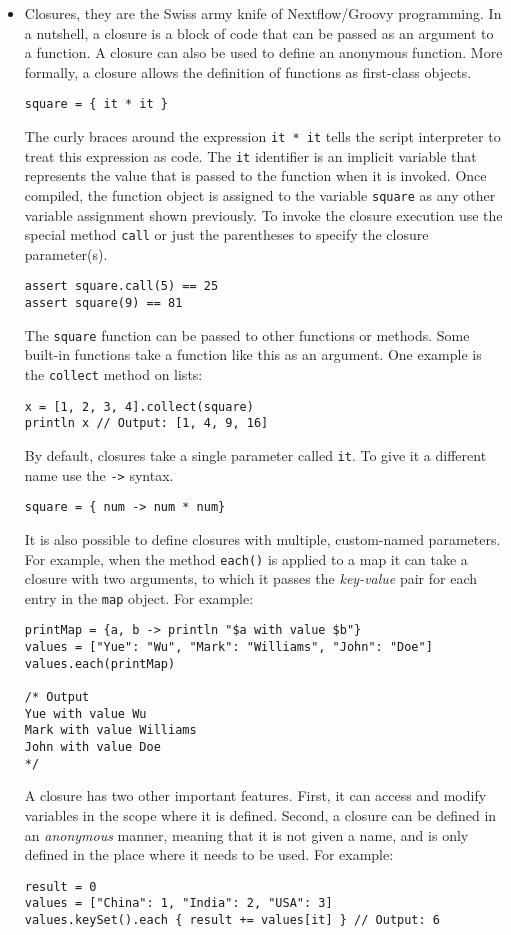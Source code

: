 \documentclass[letterpaper,11pt]{article}
\begin{document}
\begin{itemize}
\item Closures, they are the Swiss army knife of Nextflow/Groovy programming. In a nutshell, a closure is a block of code that can be passed as an argument to a function. A closure can also be used to define an anonymous function. More formally, a closure allows the definition of functions as first-class objects.
\begin{verbatim}
square = { it * it }
\end{verbatim}
The curly braces around the expression \texttt{it * it} tells the script interpreter to treat this expression as code. The \texttt{it} identifier is an implicit variable that represents the value that is passed to the function when it is invoked. Once compiled, the function object is assigned to the variable \texttt{square} as any other variable assignment shown previously. To invoke the closure execution use the special method \texttt{call} or just the parentheses to specify the closure parameter(s).
\begin{verbatim}
assert square.call(5) == 25
assert square(9) == 81
\end{verbatim}
The \texttt{square} function can be passed to other functions or methods. Some built-in functions take a function like this as an argument. One example is the \texttt{collect} method on lists:
\begin{verbatim}
x = [1, 2, 3, 4].collect(square)
println x // Output: [1, 4, 9, 16]
\end{verbatim}
By default, closures take a single parameter called \texttt{it}. To give it a different name use the \texttt{->} syntax.
\begin{verbatim}
square = { num -> num * num}
\end{verbatim}
It is also possible to define closures with multiple, custom-named parameters. For example, when the method \texttt{each()} is applied to a map it can take a closure with two arguments, to which it passes the \textit{key-value} pair for each entry in the \texttt{map} object. For example:
\begin{verbatim}
printMap = {a, b -> println "$a with value $b"}
values = ["Yue": "Wu", "Mark": "Williams", "John": "Doe"]
values.each(printMap)

/* Output
Yue with value Wu
Mark with value Williams
John with value Doe
*/
\end{verbatim}
A closure has two other important features. First, it can access and modify variables in the scope where it is defined. Second, a closure can be defined in an \textit{anonymous} manner, meaning that it is not given a name, and is only defined in the place where it needs to be used. For example:
\begin{verbatim}
result = 0
values = ["China": 1, "India": 2, "USA": 3]
values.keySet().each { result += values[it] } // Output: 6
\end{verbatim}
\end{itemize}

    
\end{document}
